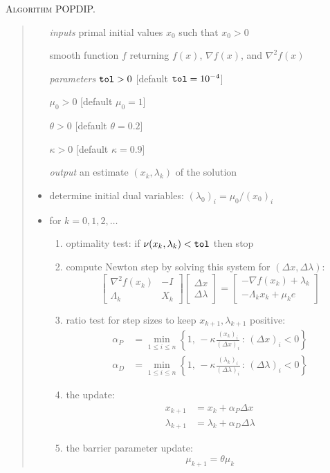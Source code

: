 \documentclass[11pt]{article}
\newcommand{\grad}{\nabla}
\begin{document}
\bigskip
\noindent \textsc{Algorithm POPDIP.}
\begin{quote}
\begin{itemize}
\item[\emph{inputs}]  primal initial values $x_0$ such that $x_0 > 0$
\item[]  smooth function $f$ returning $f(x)$, $\grad f(x)$, and $\grad^2 f(x)$
\item[\emph{parameters}]  $\text{\texttt{tol}}>0$ [default $\text{\texttt{tol}}=10^{-4}$]
\item[]  $\mu_0>0$ [default $\mu_0=1$]
\item[]  $\theta>0$ [default $\theta=0.2$]
\item[]  $\kappa>0$ [default $\kappa=0.9$]
\item[\emph{output}]  an estimate $(x_k,\lambda_k)$ of the solution
\item  determine initial dual variables: $(\lambda_0)_i = \mu_0 / (x_0)_i$
\item  for $k=0,1,2,\dots$
    \renewcommand{\labelenumi}{(\roman{enumi})}
    \begin{enumerate}
    \item optimality test: if $\nu(x_k,\lambda_k)<\text{\texttt{tol}}$ then stop
    \item compute Newton step by solving this system for $(\Delta x,\Delta \lambda)$:
    $$\begin{bmatrix}
\grad^2 f(x_k) & - I \\
\Lambda_k & X_k
\end{bmatrix}
\begin{bmatrix}
\Delta x \\
\Delta \lambda
\end{bmatrix}
=
\begin{bmatrix}
-\grad f(x_k) + \lambda_k \\
-\Lambda_k x_k + \mu_k e
\end{bmatrix}$$
    \item ratio test for step sizes to keep $x_{k+1},\lambda_{k+1}$ positive:
\begin{align*}
\alpha_P &= \min_{1\le i\le n} \left\{1, \,-\kappa \frac{(x_k)_i}{(\Delta x)_i} \,:\, (\Delta x)_i < 0\right\} \\
\alpha_D &= \min_{1\le i\le n} \left\{1, \,-\kappa \frac{(\lambda_k)_i}{(\Delta \lambda)_i} \,:\, (\Delta \lambda)_i < 0\right\}
\end{align*}
    \item the update:
\begin{align*}
x_{k+1} &= x_k + \alpha_P \Delta x \\
\lambda_{k+1} &= \lambda_k + \alpha_D \Delta \lambda
\end{align*}
    \item the barrier parameter update:
        $$\mu_{k+1} = \theta \mu_k$$
    \end{enumerate}
\end{itemize}
\end{quote}
\end{document}

